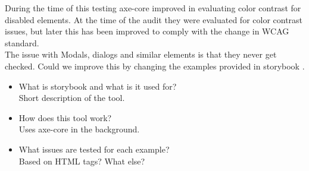 \documentclass{master_thesis}
\begin{document}
During the time of this testing axe-core improved in evaluating color contrast for disabled elements. At the time of the audit they were evaluated for color contrast issues, but later this has been improved to comply with the change in WCAG standard.\\

The issue with Modals, dialogs and similar elements is that they never get checked. Could we improve this by changing the examples provided in storybook \citep{DequeSystems2021}. \autocite{Sane2021}
\begin{itemize}
	\item What is storybook and what is it used for?\\
	Short description of the tool.
	\item How does this tool work?\\
	Uses axe-core in the background.
	\item What issues are tested for each example? \\
	Based on HTML tags? What else?
\end{itemize}
\end{document}

